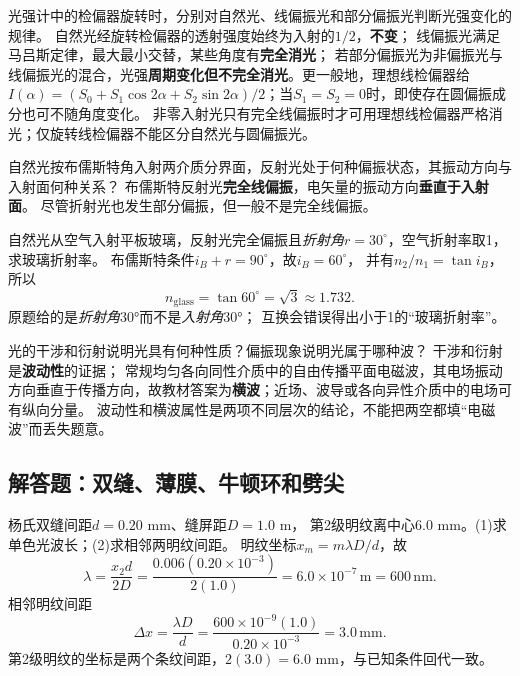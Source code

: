 \problemtext 光强计中的检偏器旋转时，分别对自然光、线偏振光和部分偏振光判断光强变化的规律。
\workings
自然光经旋转检偏器的透射强度始终为入射的$1/2$，\textbf{不变}；
线偏振光满足马吕斯定律，最大最小交替，某些角度有\textbf{完全消光}；
若部分偏振光为非偏振光与线偏振光的混合，光强\textbf{周期变化但不完全消光}。更一般地，理想线检偏器给$I(\alpha)=(S_0+S_1\cos2\alpha+S_2\sin2\alpha)/2$；当$S_1=S_2=0$时，即使存在圆偏振成分也可不随角度变化。
\crosscheck 非零入射光只有完全线偏振时才可用理想线检偏器严格消光；仅旋转线检偏器不能区分自然光与圆偏振光。

\problemtext 自然光按布儒斯特角入射两介质分界面，反射光处于何种偏振状态，其振动方向与入射面何种关系？
\workings
布儒斯特反射光\textbf{完全线偏振}，电矢量的振动方向\textbf{垂直于入射面}。
\crosscheck 尽管折射光也发生部分偏振，但一般不是完全线偏振。

\problemtext 自然光从空气入射平板玻璃，反射光完全偏振且\emph{折射角}$r=30^\circ$，空气折射率取1，求玻璃折射率。
\workings
布儒斯特条件$i_B+r=90^\circ$，故$i_B=60^\circ$，
并有$n_2/n_1=\tan i_B$，所以
\[
\boxed{n_{\mathrm{glass}}=\tan60^\circ=\sqrt3\approx1.732}.
\]
\crosscheck 原题给的是\emph{折射角}30°而不是\emph{入射角}30°；
互换会错误得出小于1的“玻璃折射率”。

\problemtext 光的干涉和衍射说明光具有何种性质？偏振现象说明光属于哪种波？
\workings
干涉和衍射是\textbf{波动性}的证据；
常规均匀各向同性介质中的自由传播平面电磁波，其电场振动方向垂直于传播方向，故教材答案为\textbf{横波}；近场、波导或各向异性介质中的电场可有纵向分量。
\crosscheck 波动性和横波属性是两项不同层次的结论，不能把两空都填“电磁波”而丢失题意。

\subsection{解答题：双缝、薄膜、牛顿环和劈尖}

\problemtext 杨氏双缝间距$d=0.20$ mm、缝屏距$D=1.0$ m，
第2级明纹离中心$6.0$ mm。(1)求单色光波长；(2)求相邻两明纹间距。
\workings
明纹坐标$x_m=m\lambda D/d$，故
\[
\boxed{\lambda=\frac{x_2d}{2D}
=\frac{0.006(0.20\times10^{-3})}{2(1.0)}
=6.0\times10^{-7}\,\mathrm m=600\,\mathrm{nm}}.
\]
相邻明纹间距
\[
\boxed{\Delta x=\frac{\lambda D}{d}
=\frac{600\times10^{-9}(1.0)}{0.20\times10^{-3}}
=3.0\,\mathrm{mm}}.
\]
\crosscheck 第2级明纹的坐标是两个条纹间距，$2(3.0)=6.0$ mm，与已知条件回代一致。


